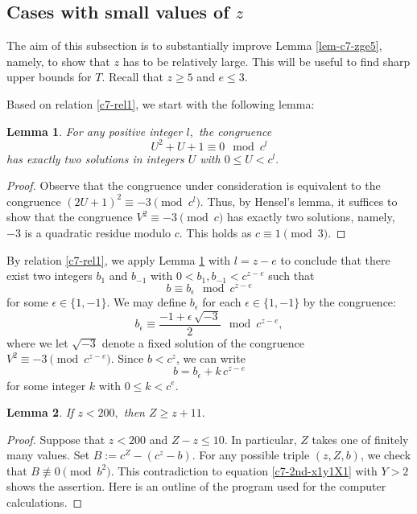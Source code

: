 \documentclass[11pt]{amsart}
\newtheorem{lem}{Lemma}[section]
\numberwithin{equation}{section}
\begin{document}
\subsection{Cases with small values of $z$} 

The aim of this subsection is to substantially improve Lemma \ref{lem-c7-zge5}, namely, to show that $z$ has to be relatively large.
This will be useful to find sharp upper bounds for $T$.
Recall that $z \ge 5$ and $e \le 3$.

Based on relation \eqref{c7-rel1}, we start with the following lemma:

\begin{lem}\label{lem-c7-HL}
For any positive integer $l,$ the congruence 
\[
U^2+U+1 \equiv 0 \mod c^l
\]
has exactly two solutions in integers $U$ with $0 \le U<c^l.$
\end{lem}

\begin{proof}
Observe that the congruence under consideration is equivalent to the congruence $(2U+1)^2 \equiv -3 \pmod{c^l}$.
Thus, by Hensel's lemma, it suffices to show that the congruence $V^2 \equiv -3 \pmod{c}$ has exactly two solutions, namely, $-3$ is a quadratic residue modulo $c$. 
This holds as $c \equiv 1 \pmod{3}$.
\end{proof}

By relation \eqref{c7-rel1}, we apply Lemma \ref{lem-c7-HL} with $l=z-e$ to conclude that there exist two integers $b_1$ and $b_{-1}$ with $0<b_1,b_{-1}<c^{z-e}$ such that
\[
b \equiv b_{\epsilon} \mod{c^{z-e}}
\]
for some $\epsilon \in \{1,-1\}$.
We may define $b_{\epsilon}$ for each $\epsilon \in \{1,-1\}$ by the congruence: 
\[
b_\epsilon \equiv \frac{-1 + \epsilon\,\sqrt{-3}}{2} \mod{c^{z-e}},
\]
where we let $\sqrt{-3}$ denote a fixed solution of the congruence $V^2 \equiv -3 \pmod{c^{z-e}}$.
Since $b<c^z$, we can write
\[
b = b_\epsilon + k\,c^{z-e}
\]
for some integer $k$ with $0 \le k <c^e$. 

\begin{lem}\label{lem-c7-Zminuszge11}
If $z<200,$ then $Z \ge z+11.$
\end{lem}

\begin{proof}
Suppose that $z<200$ and $Z-z \le 10$.
In particular, $Z$ takes one of finitely many values.
Set $B:= c^Z - (c^z-b)$.
For any possible triple $(z,Z,b)$, we check that $B \not\equiv 0 \pmod{b^2}$. 
This contradiction to equation \eqref{c7-2nd-x1y1X1} with $Y>2$ shows the assertion. 
Here is an outline of the program used for the computer calculations. 


\end{proof}
\end{document}
